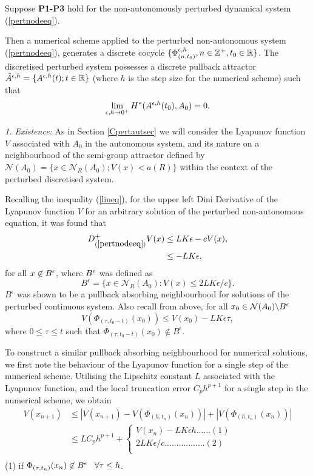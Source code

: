 \begin{therm}\label{dispertthm}
  Suppose \textbf{P1-P3} hold for the non-autonomously perturbed
  dynamical system (\ref{pertnodeeq}).

  Then a numerical scheme applied to the perturbed non-autonomous system
  (\ref{pertnodeeq}), generates a discrete cocycle $\{
  \Phi^{\epsilon,h}_{(n,t_0)}, n \in \mathbb{Z}^+, t_0 \in \mathbb{R} \}$. The
  discretised perturbed system possesses a discrete pullback attractor
  $\hat{A}^{\epsilon,h} = \{A^{\epsilon,h}(t); t \in \mathbb{R} \}$ (where $h$
is   the step size for the numerical scheme) such that
  \[ \lim_{\epsilon, h \rightarrow 0^{+}}
        H^{*}(A^{\epsilon,h}(t_0),A_0)=0. \]
\end{therm}
\begin{prf}
  {\em 1. Existence: }
  As in Section \ref{Cpertautsec} we will consider the Lyapunov function
  $V$ associated with $A_0$ in the autonomous system, and its nature on
  a neighbourhood of the semi-group attractor defined by $\mathcal{N}(A_0)
  = \{ x \in \mathcal{N}_R(A_0); V(x) < a(R) \}$ within the context of the
  perturbed discretised system.

  Recalling the inequality (\ref{lineq}), for the upper left Dini Derivative
  of the Lyapunov function $V$ for an arbitrary solution of the perturbed
  non-autonomous equation, it was found that
  \begin{align*}
  D^{+}_{(\ref{pertnodeeq})}V(x) & \leq L K \epsilon - c V(x), \\
  & \leq - LK \epsilon,
  \end{align*}
  for all $x \not \in B^{\epsilon}$, where $B^{\epsilon}$ was defined as
  \[ B^{\epsilon} = \{x \in \mathcal{N}_R(A_0) : V(x) \leq 2L K \epsilon
  /c \}. \]
  $B^{\epsilon}$ was shown to be a pullback absorbing neighbourhood for
  solutions of the perturbed continuous system. Also recall from above, for
  all $x_0 \in \mathcal{N}(A_0) \backslash B^{\epsilon}$
  \[  V(\Phi_{(\tau,t_0-t)}(x_0)) \leq V(x_{0}) - LK\epsilon \tau, \]
  where $0 \leq \tau \leq t$ such that $\Phi_{(\tau,t_0 - t)}(x_0) \not
  \in B^{\epsilon}$.

  To construct a similar pullback absorbing neighbourhood for numerical
  solutions, we first note the behaviour of the Lyapunov function for a
  single step of the numerical scheme. Utilising the Lipschitz constant $L$
  associated with the Lyapunov function, and the local truncation error
$C_ph^{p+1}$ for a single   step in the numerical scheme, we obtain
  \begin{align*}
    V(x_{n+1}) & \leq |V(x_{n+1}) -
             V(\Phi_{(h,t_n)}(x_n))| + |V(\Phi_{(h,t_n)}(x_n))| \\
    & \leq LC_{p}h^{p+1} +  \left\{ \begin{array}{c}
             V(x_{n}) - LK \epsilon h ......(1) \\
             2LK\epsilon /c .................(2) \\
             \end{array} \right.  \\
  \end{align*}
  (1) if $\Phi_{(\tau,t_n)}(x_n) \not\in B^{\epsilon} \hspace{3mm} \forall
  \tau \leq h$.


\end{prf}
